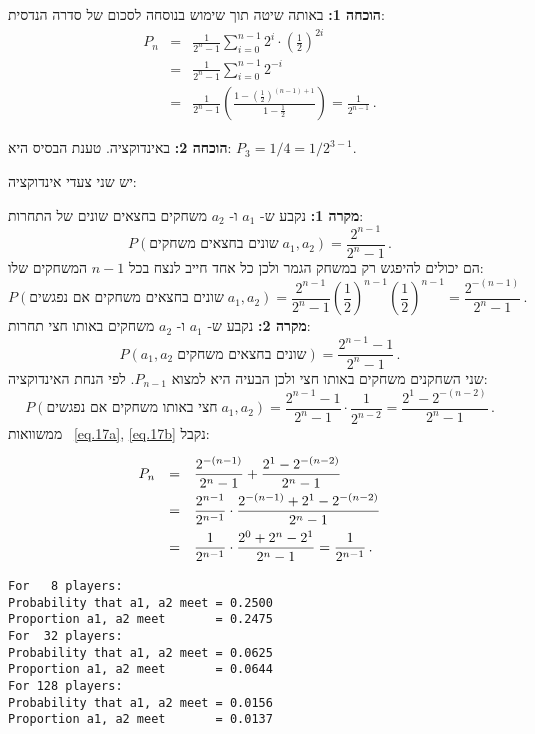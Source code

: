 \textbf{הוכחה 1:}
באותה שיטה תוך שימוש בנוסחה לסכום של סדרה הנדסית:
\begin{eqnarray*}
P_n&=&\frac{1}{2^n-1}\sum_{i=0}^{n-1}2^i\cdot \left(\frac{1}{2}\right)^{2i}\\
&=&\frac{1}{2^n-1}\sum_{i=0}^{n-1}2^{-i}\\
&=&\frac{1}{2^n-1}
  \left(
    \frac{1-\left(\frac{1}{2}\right)^{(n-1)+1}}
         {1-\frac{1}{2}}
  \right)=\frac{1}{2^{n-1}}\,.
\end{eqnarray*}

\textbf{הוכחה 2:}
באינדוקציה. טענת הבסיס היא:
$P_3=1/4=1/2^{3-1}$.

יש שני צעדי אינדוקציה:

\textbf{מקרה 1:} 
נקבע ש-%
$a_1$
ו-%
$a_2$
משחקים בחצאים שונים של התחרות:
\[
P(\textrm{שונים בחצאים משחקים}\;a_1,a_2)=\frac{2^{n-1}}{2^n-1}\,.
\]
הם יכולים להיפגש רק במשחק הגמר ולכן כל אחד חייב לנצח בכל 
$n-1$
המשחקים שלו:
\begin{equation}\label{eq.17a}
P(\textrm{שונים בחצאים משחקים אם נפגשים}\; a_1,a_2)=\frac{2^{n-1}}{2^n-1} \left(\frac{1}{2}\right)^{n-1} \left(\frac{1}{2}\right)^{n-1}=\frac{2^{-(n-1)}}{2^n-1}\,.
\end{equation}
\textbf{מקרה 2:}
נקבע ש-%
$a_1$
ו-%
$a_2$
משחקים באותו חצי תחרות:
\[
P(a_1,a_2\;\textrm{שונים בחצאים משחקים})=\frac{2^{n-1}-1}{2^n-1}\,.
\]
שני השחקנים משחקים באותו חצי ולכן הבעיה היא למצוא
$P_{n-1}$.
לפי הנחת האינדוקציה:
\begin{equation}\label{eq.17b}
P(\textrm{חצי באותו משחקים אם נפגשים}\; a_1,a_2)=\frac{2^{n-1}-1}{2^n-1}\cdot \frac{1}{2^{n-2}}=\frac{2^{1}-2^{-(n-2)}}{2^n-1}\,.
\end{equation}
ממשוואות%
~\ref{eq.17a}, \ref{eq.17b}
נקבל:
\[
\renewcommand*{\arraystretch}{2.2}
\begin{array}{rcl}
P_n&=&\disfrac{2^{-(n-1)}}{2^n-1}+\disfrac{2^{1}-2^{-(n-2)}}{2^n-1}\\
&=&\disfrac{2^{n-1}}
        {2^{n-1}}\cdot 
   \disfrac{2^{-(n-1)}+2^{1}-2^{-(n-2)}}
        {2^n-1}\\
&=&\disfrac{1}
        {2^{n-1}}\cdot 
   \disfrac{2^0+2^n-2^1}
        {2^n-1}=\disfrac{1}{2^{n-1}}\,.
\end{array}
\]

\sml{}
\begin{verbatim}
For   8 players:
Probability that a1, a2 meet = 0.2500
Proportion a1, a2 meet       = 0.2475
For  32 players:
Probability that a1, a2 meet = 0.0625
Proportion a1, a2 meet       = 0.0644
For 128 players:
Probability that a1, a2 meet = 0.0156
Proportion a1, a2 meet       = 0.0137
\end{verbatim}

